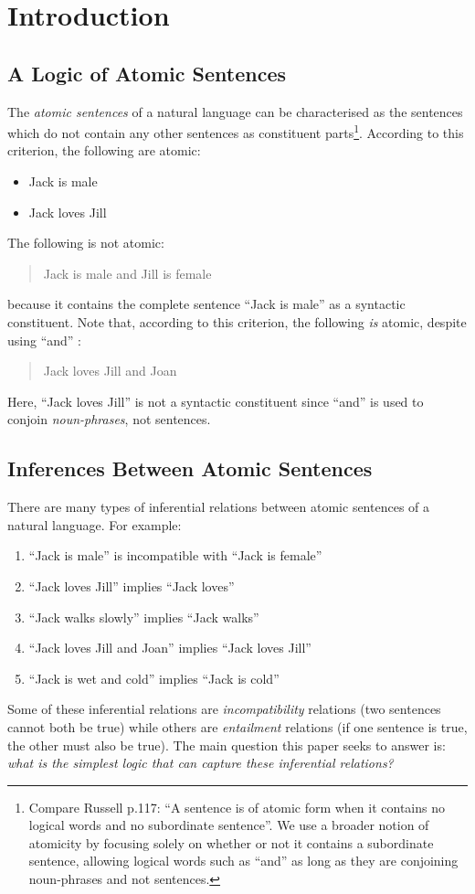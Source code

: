 \section{Introduction}\label{introduction}



\subsection{A Logic of Atomic Sentences}
The \emph{atomic sentences} of a natural language can be characterised as the sentences which do not contain any other sentences as constituent parts\footnote{Compare Russell \cite{russell} p.117: ``A sentence is of atomic form when it contains no logical words and no subordinate sentence''. We use a broader notion of atomicity by focusing solely on whether or not it contains a subordinate sentence, allowing logical words such as ``and'' as long as they are conjoining noun-phrases and not sentences.}. 
According to this criterion, the following are atomic:
\begin{itemize}
\item
Jack is male
\item
Jack loves Jill
\end{itemize}
The following is not atomic:
\begin{quote}
Jack is male and Jill is female
\end{quote}
because it contains the complete sentence ``Jack is male'' as a syntactic constituent.
Note that, according to this criterion, the following \emph{is} atomic, despite using ``and'' :
\begin{quote}
Jack loves Jill and Joan
\end{quote}
Here, ``Jack loves Jill'' is not a syntactic constituent since ``and'' is used to conjoin \emph{noun-phrases}, not sentences.

\subsection{Inferences Between Atomic Sentences}
There are many types of inferential relations between atomic sentences of a natural language.
For example:
\begin{enumerate}
\item
``Jack is male'' is incompatible with ``Jack is female''
\item
``Jack loves Jill'' implies ``Jack loves''
\item
``Jack walks slowly'' implies ``Jack walks''
\item
``Jack loves Jill and Joan'' implies ``Jack loves Jill''
\item
``Jack is wet and cold'' implies ``Jack is cold''
\end{enumerate}
Some of these inferential relations are \emph{incompatibility} relations (two sentences cannot both be true) while others are \emph{entailment} relations (if one sentence is true, the other must also be true).
The main question this paper seeks to answer is: \emph{what is the simplest logic that can capture these inferential relations?}

